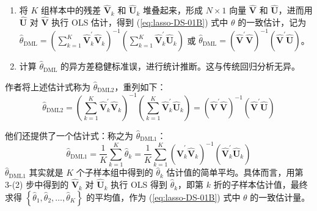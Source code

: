 {\begin{enumerate}
\begin{enumerate}
   \end{enumerate}
\item 将 $K$ 组样本中的残差 $\widehat{\boldsymbol{V}}_{k}$ 和 $\widehat{\boldsymbol{U}}_{k}$ 堆叠起来，形成 $N \times 1$ 向量 $\widehat{\boldsymbol{V}}$ 和 $\widehat{\boldsymbol{U}}$，进而用 $\widehat{\boldsymbol{U}}$ 对 $\widehat{\boldsymbol{V}}$ 执行 OLS 估计，得到 (\ref{eq:lasso-DS-01B}) 式中 $\theta$ 的一致估计，记为  $\widehat{\theta}_{\mathrm{DML}}=\left(\sum_{k=1}^{K} \widehat{\boldsymbol{V}}_{k}^{\prime} \widehat{\boldsymbol{V}}_{k}\right)^{-1}\left(\sum_{k=1}^{K} \widehat{\boldsymbol{V}}_{k}^{\prime} \widehat{\boldsymbol{U}}_{k}\right)$ 或 $\widehat{\theta}_{\mathrm{DML}}=(\widehat{\boldsymbol{V}}^{\prime} \widehat{\boldsymbol{V}})^{-1}(\widehat{\boldsymbol{V}}^{\prime} \widehat{\boldsymbol{U}})$。
\item 计算 $\widehat{\theta}_{\mathrm{DML}}$ 的异方差稳健标准误，进行统计推断。这与传统回归分析无异。
\end{enumerate}

作者将上述估计式称为 $\widehat{\theta}_{\mathrm{DML2}}$，重列如下：
\begin{equation}\label{eq:lasso-DML-01}
	 \widehat{\theta}_{\mathrm{DML2}}
	 =
	 \left(\sum_{k=1}^{K} \widehat{\boldsymbol{V}}_{k}^{\prime} \widehat{\boldsymbol{V}}_{k}\right)^{-1}\left(\sum_{k=1}^{K} \widehat{\boldsymbol{V}}_{k}^{\prime} \widehat{\boldsymbol{U}}_{k}\right)
	 =
	 \left(\widehat{\boldsymbol{V}}^{\prime} \widehat{\boldsymbol{V}}\right)^{-1}\left(\widehat{\boldsymbol{V}}^{\prime} \widehat{\boldsymbol{U}}\right)
\end{equation}

他们还提供了一个估计式：称之为 $\widehat{\theta}_{\mathrm{DML1}}$：
\begin{equation}\label{eq:lasso-DML-02}
	 \widehat{\theta}_{\mathrm{DML1}}
	 = 
	 \frac{1}{K}
	 	 \sum_{k=1}^{K}\widehat{\theta}_k
	 = 
	 \frac{1}{K}
	 \sum_{k=1}^{K}\left(\widehat{\boldsymbol{V}}_{k}^{\prime} \widehat{\boldsymbol{V}}_{k}\right)^{-1}\left(\widehat{\boldsymbol{V}}_{k}^{\prime} \widehat{\boldsymbol{U}}_{k}\right)
\end{equation}
$\widehat{\theta}_{\mathrm{DML1}}$ 其实就是 $K$ 个子样本组中得到的 $\widehat{\theta}_k$ 估计值的简单平均。具体而言，用第 3-(2) 步中得到的 $\widehat{\boldsymbol{V}}_{k}$ 对 $\widehat{\boldsymbol{U}}_{k}$ 执行 OLS 得到 $\widehat{\theta}_k$，即第 $k$ 折的子样本估计值，最终求得 $\left\{\widehat{\theta}_1, \widehat{\theta}_2, \ldots, \widehat{\theta}_K \right\}$ 的平均值，作为 (\ref{eq:lasso-DS-01B}) 式中 $\theta$ 的一致估计量。

}

